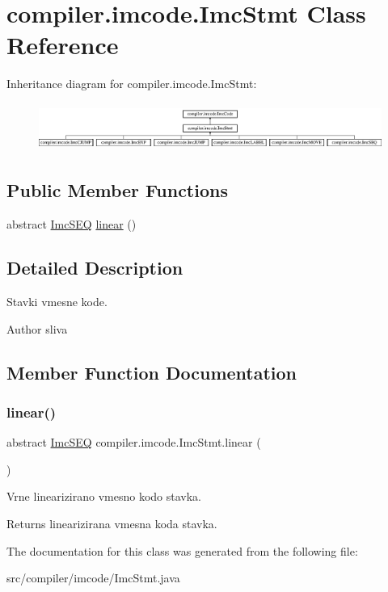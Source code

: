 \hypertarget{classcompiler_1_1imcode_1_1_imc_stmt}{}\section{compiler.\+imcode.\+Imc\+Stmt Class Reference}
\label{classcompiler_1_1imcode_1_1_imc_stmt}
Inheritance diagram for compiler.\+imcode.\+Imc\+Stmt\+:\begin{figure}[H]
\begin{center}
\leavevmode
\includegraphics[height=1.573034cm]{classcompiler_1_1imcode_1_1_imc_stmt}
\end{center}
\end{figure}
\subsection*{Public Member Functions}
\begin{DoxyCompactItemize}
\item 
abstract \hyperlink{classcompiler_1_1imcode_1_1_imc_s_e_q}{Imc\+S\+EQ} \hyperlink{classcompiler_1_1imcode_1_1_imc_stmt_a7691361d3b1d79572a14eddd6b4a69e6}{linear} ()
\end{DoxyCompactItemize}


\subsection{Detailed Description}
Stavki vmesne kode.

\begin{DoxyAuthor}{Author}
sliva 
\end{DoxyAuthor}


\subsection{Member Function Documentation}
\mbox{\label{classcompiler_1_1imcode_1_1_imc_stmt_a7691361d3b1d79572a14eddd6b4a69e6}} 
\subsubsection{\texorpdfstring{linear()}{linear()}}
{\footnotesize\ttfamily abstract \hyperlink{classcompiler_1_1imcode_1_1_imc_s_e_q}{Imc\+S\+EQ} compiler.\+imcode.\+Imc\+Stmt.\+linear (\begin{DoxyParamCaption}{ }\end{DoxyParamCaption})\hspace{0.3cm}{\ttfamily [abstract]}}

Vrne linearizirano vmesno kodo stavka.

\begin{DoxyReturn}{Returns}
linearizirana vmesna koda stavka. 
\end{DoxyReturn}


The documentation for this class was generated from the following file\+:\begin{DoxyCompactItemize}
\item 
src/compiler/imcode/Imc\+Stmt.\+java\end{DoxyCompactItemize}

